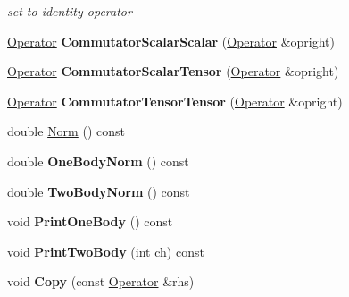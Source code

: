 \begin{DoxyCompactItemize}
\begin{DoxyCompactList}\small\item\em set to identity operator \end{DoxyCompactList}\item 
\hypertarget{classOperator_a55b95477ad8674877eb4d15491cfe9a0}{\hyperlink{classOperator}{Operator} {\bfseries Commutator\-Scalar\-Scalar} (\hyperlink{classOperator}{Operator} \&opright)}\label{classOperator_a55b95477ad8674877eb4d15491cfe9a0}

\item 
\hypertarget{classOperator_a7db0372f91cffc85b293f7750c72944a}{\hyperlink{classOperator}{Operator} {\bfseries Commutator\-Scalar\-Tensor} (\hyperlink{classOperator}{Operator} \&opright)}\label{classOperator_a7db0372f91cffc85b293f7750c72944a}

\item 
\hypertarget{classOperator_aa6234e3c9b20635d32a082d74d45412b}{\hyperlink{classOperator}{Operator} {\bfseries Commutator\-Tensor\-Tensor} (\hyperlink{classOperator}{Operator} \&opright)}\label{classOperator_aa6234e3c9b20635d32a082d74d45412b}

\item 
double \hyperlink{classOperator_acb9d7959232a636191b91f6bf5b7b0c8}{Norm} () const 
\item 
\hypertarget{classOperator_a72dc7aea85c7775097d235de6f17f330}{double {\bfseries One\-Body\-Norm} () const }\label{classOperator_a72dc7aea85c7775097d235de6f17f330}

\item 
\hypertarget{classOperator_af1c40bdef64ec9abd5d95e8328565a67}{double {\bfseries Two\-Body\-Norm} () const }\label{classOperator_af1c40bdef64ec9abd5d95e8328565a67}

\item 
\hypertarget{classOperator_a5ec5a8110337108ac31d3af7337e454b}{void {\bfseries Print\-One\-Body} () const }\label{classOperator_a5ec5a8110337108ac31d3af7337e454b}

\item 
\hypertarget{classOperator_a905e42cefafaca0eb155cf41b3cd37b8}{void {\bfseries Print\-Two\-Body} (int ch) const }\label{classOperator_a905e42cefafaca0eb155cf41b3cd37b8}

\item 
\hypertarget{classOperator_a851708e76dd24603d0527f6c5c1bd544}{void {\bfseries Copy} (const \hyperlink{classOperator}{Operator} \&rhs)}\label{classOperator_a851708e76dd24603d0527f6c5c1bd544}


\end{DoxyCompactItemize}
